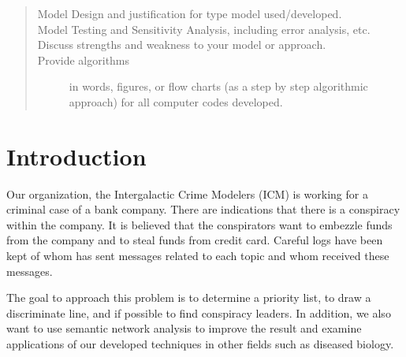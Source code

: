 \documentclass{icmmcm}
\begin{document}
\begin{summary}
\begin{quotation}
\begin{description}
\item[Model Design and justification for type model used/developed.]

\item[Model Testing and Sensitivity Analysis, including error
  analysis, etc.]

\item[Discuss strengths and weakness to your model or approach.]

\item[Provide algorithms] in words, figures, or flow charts (as a step
  by step algorithmic approach) for all computer codes developed.
\end{description}
 \citep{comap-mcm-rules}
\end{quotation}

\end{summary}
 


\maketitle
\tableofcontents

\listoffigures
\listoftables  
 

\section{Introduction}%
\label{sec:introduction}


Our organization, the Intergalactic Crime Modelers (ICM) is working
for a criminal case of a bank company. 
There are indications that there is a conspiracy within the company. 
It is believed that the conspirators want to embezzle funds from
the company and to steal funds from credit card.
Careful logs have been kept of whom has sent messages related to each
topic and whom received these messages.

The goal to approach this problem is to determine a priority list, 
to draw a discriminate line, and if possible to find
conspiracy leaders. In addition, we also want to use semantic
network analysis to improve the result and examine applications of
our developed techniques in other fields such as diseased biology.
\end{document}
